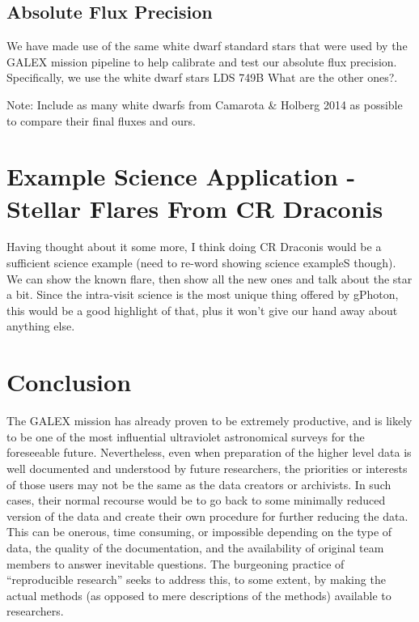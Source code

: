 \documentclass[5p]{elsarticle}
\begin{document}
\subsection{Absolute Flux Precision}
We have made use of the same white dwarf standard stars that were used by the GALEX mission pipeline to help calibrate and test our absolute flux precision.  Specifically, we use the white dwarf stars LDS 749B {\color{red}What are the other ones?}.

{\color{red}Note: Include as many white dwarfs from Camarota \& Holberg 2014 as possible to compare their final fluxes and ours.}

\section{Example Science Application - Stellar Flares From CR Draconis}
\label{scienceexamples}

{\color{red}Having thought about it some more, I think doing CR Draconis would be a sufficient science example (need to re-word showing science exampleS though).  We can show the known flare, then show all the new ones and talk about the star a bit.  Since the intra-visit science is the most unique thing offered by gPhoton, this would be a good highlight of that, plus it won't give our hand away about anything else.}

\section{Conclusion}

The GALEX mission has already proven to be extremely productive, and is likely to be one of the most influential ultraviolet astronomical surveys for the foreseeable future.  Nevertheless, even when preparation of the higher level data is well documented and understood by future researchers, the priorities or interests of those users may not be the same as the data creators or archivists. In such cases, their normal recourse would be to go back to some minimally reduced version of the data and create their own procedure for further reducing the data. This can be onerous, time consuming, or impossible depending on the type of data, the quality of the documentation, and the availability of original team members to answer inevitable questions. The burgeoning practice of ``reproducible research'' seeks to address this, to some extent, by making the actual methods (as opposed to mere descriptions of the methods) available to researchers.
\end{document}
